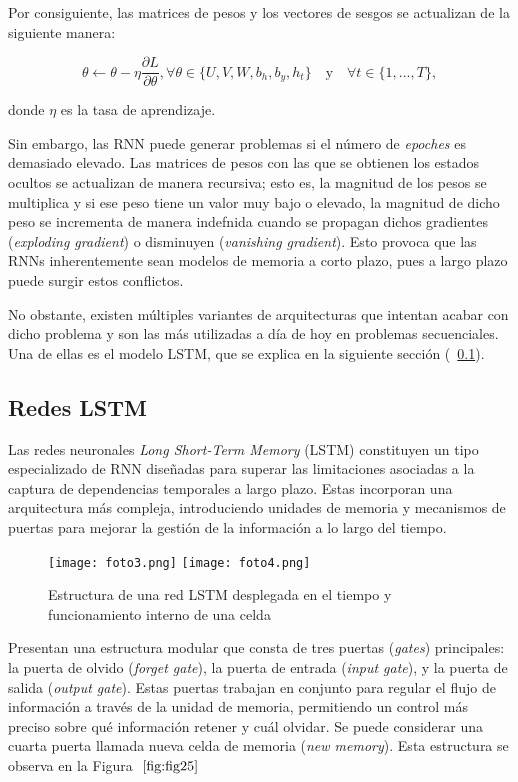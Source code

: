 \documentclass[12pt,twoside]{article}
\begin{document}
Por consiguiente, las matrices de pesos y los vectores de sesgos se actualizan de la siguiente manera: 

\begin{equation}
\theta \leftarrow \theta - \eta  \frac{\partial L}{\partial \theta}, \forall \theta \in \{U,V,W,b_h,b_y, h_t \} \text{  }\text{ y }\text{  } \forall t \in \{ 1,...,T\},
\end{equation}

donde $\eta$ es la tasa de aprendizaje.

Sin embargo, las RNN puede generar problemas si el número de \textit{epoches} es demasiado elevado. Las matrices de pesos con las que se obtienen los estados ocultos se actualizan de manera recursiva; esto es, la magnitud de los pesos se multiplica y si ese peso tiene un valor muy bajo o elevado, la magnitud de dicho peso se incrementa de manera indefnida cuando se propagan dichos gradientes (\textit{exploding gradient}) o disminuyen (\textit{vanishing gradient}). Esto provoca que las RNNs inherentemente sean modelos de memoria a corto plazo, pues a largo plazo puede surgir estos conflictos.

No obstante, existen múltiples variantes de arquitecturas que intentan acabar con dicho problema y son las más utilizadas a día de hoy en problemas secuenciales. Una de ellas es el modelo LSTM, que se explica en la siguiente sección (~\ref{sec:17}).


\subsection{Redes LSTM}\label{sec:17}

Las redes neuronales \textit{Long Short-Term Memory} (LSTM) constituyen un tipo especializado de RNN diseñadas para superar las limitaciones asociadas a la captura de dependencias temporales a largo plazo. Estas incorporan una arquitectura más compleja, introduciendo unidades de memoria y mecanismos de puertas para mejorar la gestión de la información a lo largo del tiempo.

\begin{figure}[h]
    \centering
    \texttt{[image: foto3.png]}
    \texttt{[image: foto4.png]}
    \caption{Estructura de una red LSTM desplegada en el tiempo y funcionamiento interno de una celda} 
    \label{fig:fig25}
\end{figure}


Presentan una estructura modular que consta de tres puertas (\textit{gates}) principales: la puerta de olvido (\textit{forget gate}), la puerta de entrada (\textit{input gate}), y la puerta de salida (\textit{output gate}). Estas puertas trabajan en conjunto para regular el flujo de información a través de la unidad de memoria, permitiendo un control más preciso sobre qué información retener y cuál olvidar. Se puede considerar una cuarta puerta llamada nueva celda de memoria (\textit{new memory}). Esta estructura se observa en la Figura $~\ref{fig:fig25}$
\end{document}
